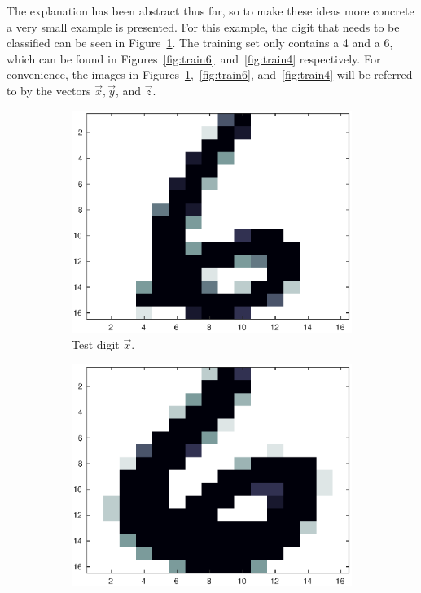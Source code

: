 The explanation has been abstract thus far, so to make these ideas more concrete a very small example is presented.
For this example, the digit that needs to be classified can be seen in Figure~\ref{fig:test6}. The training set only contains a 4 and a 6, which can be found in Figures~\ref{fig:train6}~and~\ref{fig:train4} respectively.
For convenience, the images in Figures~\ref{fig:test6},~\ref{fig:train6}, and~\ref{fig:train4} will be referred to by the vectors \(\vec{x}, \vec{y}\), and \(\vec{z}\).
\begin{figure}[H]
    \centering
    \begin{subfigure}[b]{.3\textwidth}
        \includegraphics[width = \linewidth]{images/knn/test6.eps}
        \caption{Test digit \(\vec{x}\).}\label{fig:test6}
    \end{subfigure}
    \begin{subfigure}[b]{.3\textwidth}
        \includegraphics[width = \linewidth]{images/knn/train6.eps}

\end{subfigure}
\end{figure}
